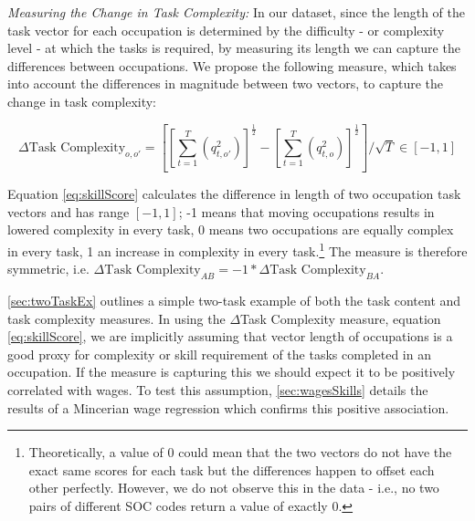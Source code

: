 \documentclass[12pt,authoryear]{elsarticle}
\begin{document}
\vspace{2mm}	
	
	
\textit{Measuring the Change in Task Complexity:} In our dataset, since the length of the task vector for each occupation is determined by the difficulty - or complexity level - at which the tasks is required, by measuring its length we can capture the differences between occupations. We propose the following measure, which takes into account the differences in magnitude between two vectors, to capture the change in task complexity: 
	
	\begin{equation}
	\label{eq:skillScore}
	\Delta\text{Task Complexity}_{o,o'} = \left[\left[\sum_{t=1}^{T}(q_{t,o'}^{2})\right]^{\frac{1}{2}} - \left[\sum_{t=1}^{T}(q_{t,o}^{2})\right]^{\frac{1}{2}} \right]/\sqrt{T} \in[-1,1]
	\end{equation}
	
	
	\noindent Equation \ref{eq:skillScore} calculates the difference in length of two occupation task vectors and has range $[-1,1]$; -1 means that moving occupations results in lowered complexity in every task, 0 means two occupations are equally complex in every task, 1 an increase in complexity in every task.\footnote{Theoretically, a value of 0 could mean that the two vectors do not have the exact same scores for each task but the differences happen to offset each other perfectly. However, we do not observe this in the data - i.e., no two pairs of different SOC codes return a value of exactly 0. } The measure is therefore symmetric, i.e. $\Delta\text{Task Complexity}_{{A}{B}}  = -1* \Delta\text{Task Complexity}_{{B}{A}}$.
	
	\vspace{2mm}
	
\ref{sec:twoTaskEx} outlines a simple two-task example of both the task content and task complexity measures. In using the $\Delta$Task Complexity measure, equation \ref{eq:skillScore}, we are implicitly assuming that vector length of occupations is a good proxy for complexity or skill requirement of the tasks completed in an occupation. If the measure is capturing this we should expect it to be positively correlated with wages. To test this assumption, \ref{sec:wagesSkills} details the results of a Mincerian wage regression which confirms this positive association.
	

	

	
	
	
	
\end{document}
